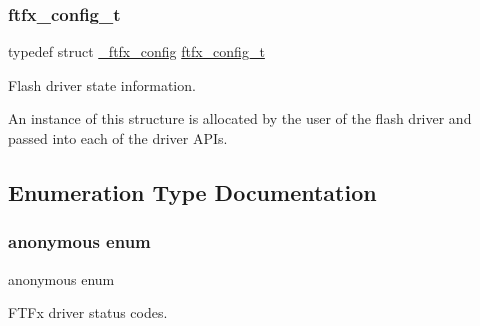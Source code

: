\subsubsection{\texorpdfstring{ftfx\_config\_t}{ftfx\_config\_t}}
{\footnotesize\ttfamily typedef struct \mbox{\hyperlink{struct__ftfx__config}{\+\_\+ftfx\+\_\+config}}  \mbox{\hyperlink{group__ftfx__controller_gab0196063c05bffb4cd2f249699a3378c}{ftfx\+\_\+config\+\_\+t}}}



Flash driver state information. 

An instance of this structure is allocated by the user of the flash driver and passed into each of the driver A\+P\+Is. 

\subsection{Enumeration Type Documentation}
\mbox{\label{group__ftfx__controller_ga458e651af6690959efa2afb96be7d609}} 
\subsubsection{\texorpdfstring{anonymous enum}{anonymous enum}}
{\footnotesize\ttfamily anonymous enum}



F\+T\+Fx driver status codes. 

